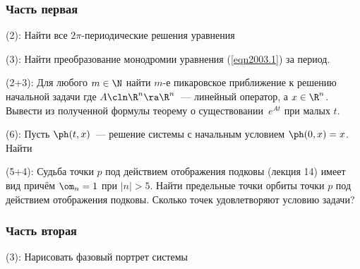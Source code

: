 \documentclass[a4paper]{article}
\newcommand{\skill}[1]{\textsf{(#1):}}
\begin{document}
\subsubsection{Часть первая}

\begin{problem}
\skill{2}
Найти все $2\pi$-периодические решения уравнения
\end{problem}

\begin{problem}
\skill{3} Найти преобразование монодромии уравнения (\ref{eqn2003.1}) за период.
\end{problem}

\begin{problem}
\skill{2+3} Для любого $m\in \N$ найти $m$-е пикаровское приближение к решению
начальной задачи
где $A\cln \R^n\ra\R^n$~--- линейный оператор, а $x\in\R^n$.
Вывести из полученной формулы теорему о существовании~$e^{At}$ при малых $t$.
\end{problem}

\begin{problem}
\skill{6}
Пусть $\ph(t,x)$~--- решение системы
с начальным условием $\ph(0,x) =x$.
Найти
\end{problem}

\begin{problem}
\skill{5+4} Судьба точки $p$ под действием отображения подковы (лекция 14)
имеет вид
причём $\om_n = 1$ при $|n| > 5$. Найти предельные точки орбиты точки $p$ под действием отображения подковы.
Сколько точек удовлетворяют условию задачи?
\end{problem}

\subsubsection{Часть вторая}

\begin{problem}
\skill{3}
Нарисовать фазовый портрет системы
\end{problem}
\end{document}
